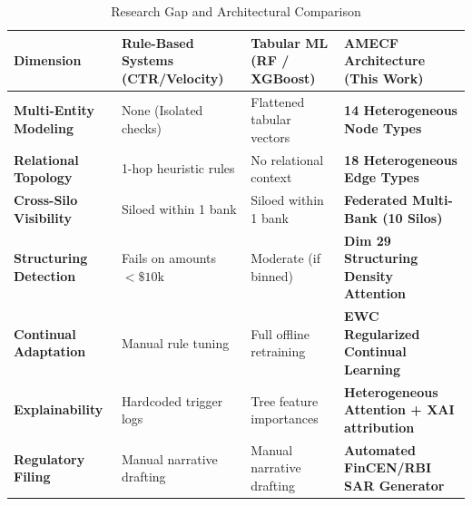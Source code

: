 \documentclass[conference]{IEEEtran}
\begin{document}
\begin{table}[t]
\caption{Research Gap and Architectural Comparison}
\label{tab:research_gap}
\centering
\begin{tabular}{@{}p{3.2cm}p{4.2cm}p{4.2cm}p{4.8cm}@{}}
\toprule
\textbf{Dimension} & \textbf{Rule-Based Systems (CTR/Velocity)} & \textbf{Tabular ML (RF / XGBoost)} & \textbf{AMECF Architecture (This Work)} \\
\midrule
\textbf{Multi-Entity Modeling} & None (Isolated checks) & Flattened tabular vectors & \textbf{14 Heterogeneous Node Types} \\
\textbf{Relational Topology} & 1-hop heuristic rules & No relational context & \textbf{18 Heterogeneous Edge Types} \\
\textbf{Cross-Silo Visibility} & Siloed within 1 bank & Siloed within 1 bank & \textbf{Federated Multi-Bank (10 Silos)} \\
\textbf{Structuring Detection} & Fails on amounts $< \$10\text{k}$ & Moderate (if binned) & \textbf{Dim 29 Structuring Density Attention} \\
\textbf{Continual Adaptation} & Manual rule tuning & Full offline retraining & \textbf{EWC Regularized Continual Learning} \\
\textbf{Explainability} & Hardcoded trigger logs & Tree feature importances & \textbf{Heterogeneous Attention + XAI attribution} \\
\textbf{Regulatory Filing} & Manual narrative drafting & Manual narrative drafting & \textbf{Automated FinCEN/RBI SAR Generator} \\
\bottomrule
\end{tabular}
\end{table}
\end{document}
